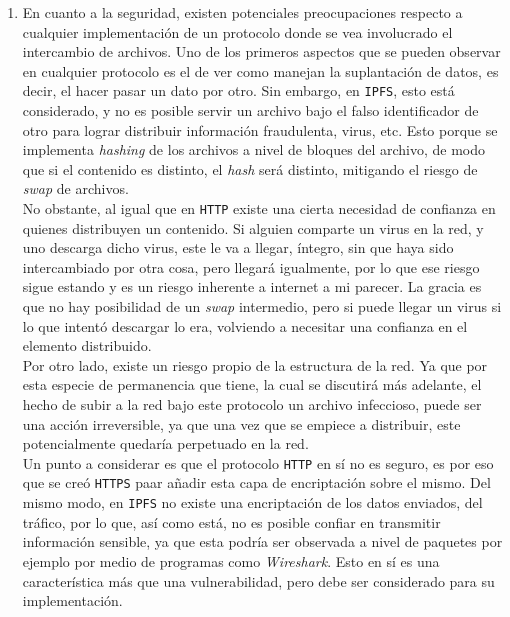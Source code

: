 \documentclass[letterpaper,10pt]{article}
\begin{document}
\begin{enumerate}
\item En cuanto a la seguridad, existen potenciales preocupaciones respecto a cualquier implementación de un protocolo donde se vea involucrado el intercambio de archivos. Uno de los primeros aspectos que se pueden observar en cualquier protocolo es el de ver como manejan la suplantación de datos, es decir, el hacer pasar un dato por otro. Sin embargo, en \texttt{IPFS}, esto está considerado, y no es posible servir un archivo bajo el falso identificador de otro para lograr distribuir información fraudulenta, virus, etc. Esto porque se implementa \textit{hashing} de los archivos a nivel de bloques del archivo, de modo que si el contenido es distinto, el \textit{hash} será distinto, mitigando el riesgo de \textit{swap} de archivos.\\

No obstante, al igual que en \texttt{HTTP} existe una cierta necesidad de confianza en quienes distribuyen un contenido. Si alguien comparte un virus en la red, y uno descarga dicho virus, este le va a llegar, íntegro, sin que haya sido intercambiado por otra cosa, pero llegará igualmente, por lo que ese riesgo sigue estando y es un riesgo inherente a internet a mi parecer. La gracia es que no hay posibilidad de un \textit{swap} intermedio, pero si puede llegar un virus si lo que intentó descargar lo era, volviendo a necesitar una confianza en el elemento distribuido.\\

Por otro lado, existe un riesgo propio de la estructura de la red. Ya que por esta especie de permanencia que tiene, la cual se discutirá más adelante, el hecho de subir a la red bajo este protocolo un archivo infeccioso, puede ser una acción irreversible, ya que una vez que se empiece a distribuir, este potencialmente quedaría perpetuado en la red.\\

Un punto a considerar es que el protocolo \texttt{HTTP} en sí no es seguro, es por eso que se creó \texttt{HTTPS} paar añadir esta capa de encriptación sobre el mismo. Del mismo modo, en \texttt{IPFS} no existe una encriptación de los datos enviados, del tráfico, por lo que, así como está, no es posible confiar en transmitir información sensible, ya que esta podría ser observada a nivel de paquetes por ejemplo por medio de programas como \textit{Wireshark}. Esto en sí es una característica más que una vulnerabilidad, pero debe ser considerado para su implementación.


\end{enumerate}
\end{document}
